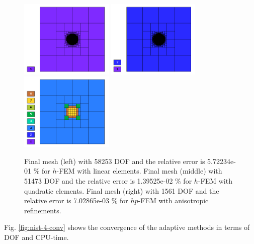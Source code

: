 \documentclass[12pt]{elsarticle}
\begin{document}
\begin{figure}[H]
\centering
\includegraphics[height=3.7cm]{nist/nist-4/mesh_h1_aniso.png}
\includegraphics[height=3.7cm]{nist/nist-4/mesh_h2_aniso.png}
\includegraphics[height=3.7cm]{nist/nist-4/mesh_hp_aniso.png}
\caption{
Final mesh (left) with 58253 DOF and the relative error is 5.72234e-01 \% for $h$-FEM with linear elements.
Final mesh (middle) with 51473 DOF and the relative error is 1.39525e-02 \% for $h$-FEM with quadratic elements.
Final mesh (right) with 1561 DOF and the relative error is 7.02865e-03 \% for $hp$-FEM with anisotropic refinements.}
\label{fig:nist-4-hp-aniso}
\end{figure}

Fig. \ref{fig:nist-4-conv} shows the convergence of the adaptive methods in terms of DOF and CPU-time.
\end{document}
